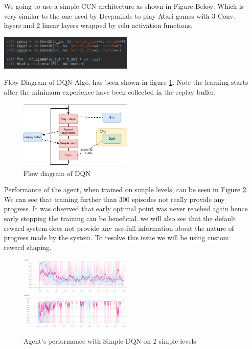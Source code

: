 \documentclass[10pt,twocolumn,letterpaper]{article}
\begin{document}
We going to use a simple CCN architecture as shown in Figure Below. Which is very similar to the one used by Deepminds to play Atari games with 3 Conv. layers and 2 linear layers wrapped by relu activation functions.

\centerline{
   \includegraphics[width=0.50\textwidth]{images/network1.png}
}

Flow Diagram of DQN Algo. has been shown in figure \ref{fig:dqnflow}. Note the learning starts after the minimum experience have been collected in the replay buffer.

\begin{figure}[h]
   \centering
    \includegraphics[width=0.50\textwidth]{images/dqnflow.png}
    \caption{Flow diagram of DQN }
    \label{fig:dqnflow}
\end{figure}

Performance of the agent, when trained on simple levels, can be seen in Figure \ref{fig:simpledqnoutput}. We can see that training further than 300 episodes not really provide any progress. It was observed that early optimal point was never reached again hence early stopping the training can be beneficial. we will also see that the default reward system does not provide any use-full information about the nature of progress made by the system. To resolve this issue we will be using custom reward shaping.

\begin{figure}[h]
   \centering
    \includegraphics[width=0.50\textwidth]{images/DQNlength.png}
    \includegraphics[width=0.50\textwidth]{images/DQNreward.png}
    \caption{Agent's performance with Simple DQN on 2 simple levels}
    \label{fig:simpledqnoutput}
\end{figure}
\end{document}
